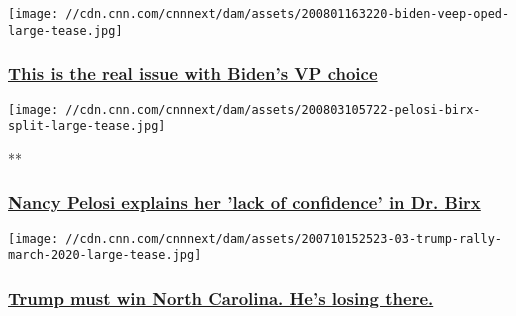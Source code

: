 \href{/2020/08/01/opinions/bidens-pick-for-vice-president-will-be-about-energizing-the-base-louis/index.html}{}

\texttt{[image: //cdn.cnn.com/cnnnext/dam/assets/200801163220-biden-veep-oped-large-tease.jpg]}

\hypertarget{this-is-the-real-issue-with-bidens-vp-choice}{%
\subsubsection{\texorpdfstring{\href{/2020/08/01/opinions/bidens-pick-for-vice-president-will-be-about-energizing-the-base-louis/index.html}{This
is the real issue with Biden's VP
choice}}{This is the real issue with Biden's VP choice}}\label{this-is-the-real-issue-with-bidens-vp-choice}}

\href{/videos/politics/2020/08/03/nancy-pelosi-lack-of-confidence-in-dr-birx-sot-nr-vpx.cnn}{}

\texttt{[image: //cdn.cnn.com/cnnnext/dam/assets/200803105722-pelosi-birx-split-large-tease.jpg]}

**

\hypertarget{nancy-pelosi-explains-her-lack-of-confidence-in-dr-birx}{%
\subsubsection{\texorpdfstring{\href{/videos/politics/2020/08/03/nancy-pelosi-lack-of-confidence-in-dr-birx-sot-nr-vpx.cnn}{Nancy
Pelosi explains her 'lack of confidence' in Dr.
Birx}}{Nancy Pelosi explains her 'lack of confidence' in Dr. Birx}}\label{nancy-pelosi-explains-her-lack-of-confidence-in-dr-birx}}

\href{/2020/08/02/politics/trump-trails-north-carolina/index.html}{}

\texttt{[image: //cdn.cnn.com/cnnnext/dam/assets/200710152523-03-trump-rally-march-2020-large-tease.jpg]}

\hypertarget{trump-must-win-north-carolina-hes-losing-there}{%
\subsubsection{\texorpdfstring{\href{/2020/08/02/politics/trump-trails-north-carolina/index.html}{Trump
must win North Carolina. He's losing
there.}}{Trump must win North Carolina. He's losing there.}}\label{trump-must-win-north-carolina-hes-losing-there}}

\href{/2020/08/02/politics/anthony-tata-nominee-pentagon/index.html}{}


